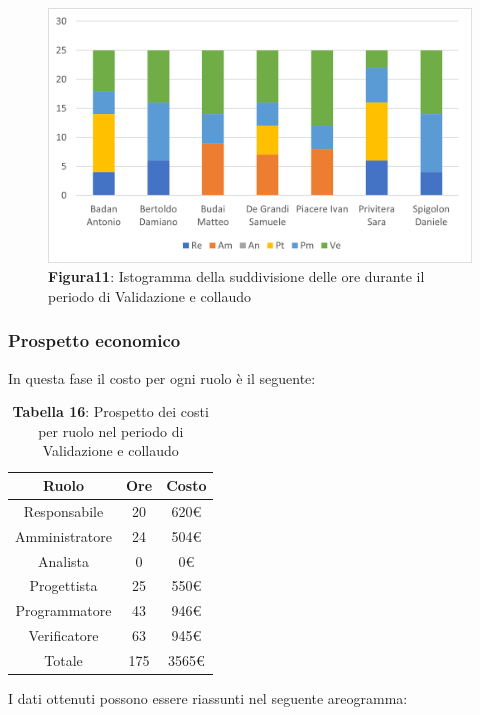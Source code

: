 \begin{figure}[H]
	\centering
	\includegraphics[width=0.7\linewidth]{res/images/Figura11.png}
	\caption*{\textbf{Figura11}: Istogramma della suddivisione delle ore durante il periodo di Validazione e collaudo}
	\label{fig:Figura10}
\end{figure}
	
	
\subsubsection{Prospetto economico}
In questa fase il costo per ogni ruolo è il seguente:

\begin{table}[H]
	\centering
	\renewcommand{\arraystretch}{1.5}
	\begin{tabular}{|c|c|c|}
		\hline
		\rowcolor{lighter-grayer}
		Ruolo & Ore & Costo \\
		\hline
		Responsabile & 20 & 620\euro \\
		\hline
		Amministratore & 24 & 504\euro \\
		\hline
		Analista & 0 & 0\euro \\
		\hline
		Progettista & 25 & 550\euro \\
		\hline
		Programmatore & 43 & 946\euro \\
		\hline
		Verificatore & 63 & 945\euro \\
		\hline
		Totale & 175 &  3565\euro \\
		\hline
	\end{tabular}
\caption*{\textbf{Tabella 16}: Prospetto dei costi per ruolo nel periodo di Validazione e collaudo\\}
\end{table}

I dati ottenuti possono essere riassunti nel seguente areogramma:


\begin{figure}[!h]
	\centering
\end{figure}

